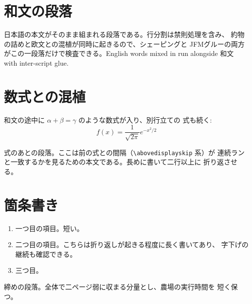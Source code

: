 \documentclass[11pt,a4paper]{ltjsarticle}
\begin{document}
\section{和文の段落}

日本語の本文がそのまま組まれる段落である。行分割は禁則処理を含み、
約物の詰めと欧文との混植が同時に起きるので、シェーピングと
JFMグルーの両方がこの一段落だけで検査できる。English words mixed in
run alongside 和文 with inter-script glue.

\section{数式との混植}

和文の途中に $\alpha + \beta = \gamma$ のような数式が入り、別行立ての
式も続く:
\begin{equation}
  f(x) = \frac{1}{\sqrt{2\pi}} e^{-x^2/2}
\end{equation}

式のあとの段落。ここは前の式との間隔（\verb|\abovedisplayskip| 系）が
連続ランと一致するかを見るための本文である。長めに書いて二行以上に
折り返させる。

\section{箇条書き}

\begin{enumerate}
  \item 一つ目の項目。短い。
  \item 二つ目の項目。こちらは折り返しが起きる程度に長く書いてあり、
        字下げの継続も確認できる。
  \item 三つ目。
\end{enumerate}

締めの段落。全体で二ページ弱に収まる分量とし、農場の実行時間を
短く保つ。
\end{document}
